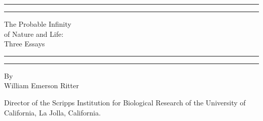 \documentclass[a4paper, 11pt, oneside, polutonikogreek, english]{article}
\begin{document}
\renewcommand\thefootnote{\Fontauri{\arabic{footnote}}}
\let\oldfootnote\footnote
    \renewcommand{\footnote}[1]{\oldfootnote{\Fontauri\large#1}}
\begin{titlepage} %
	\centering %
	\scshape %

	
	\rule{\textwidth}{1.6pt}\vspace*{-\baselineskip}\vspace*{2pt} %
	\rule{\textwidth}{0.4pt} %
	
	\vspace{0.75\baselineskip} %

        {\Huge The Probable Infinity \\of Nature and Life: \\Three Essays \\} %
	
	\vspace{0.75\baselineskip} %
	
	\rule{\textwidth}{0.4pt}\vspace*{-\baselineskip}\vspace{3.2pt} %
	\rule{\textwidth}{1.6pt} %
	
	\vspace{1\baselineskip} %
	
	
	{By \\\Large William Emerson Ritter\\} %
	
	\vspace*{1\baselineskip} %
	

        {\small Director of the Scripps Institution for Biological Research of the University of California, La Jolla, California.}
        
	

\end{titlepage}
\end{document}
